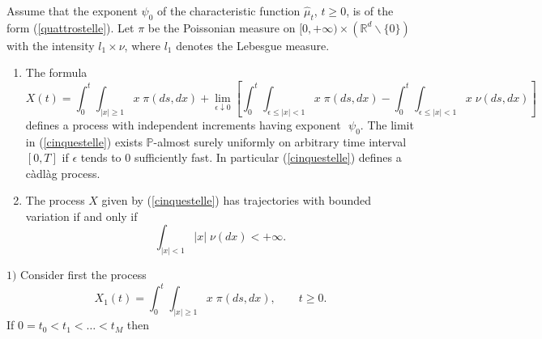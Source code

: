 \documentclass[preprint]{imsart}
\def\P{\mathbb P}
\def\R{\mathbb R}
\begin{document}
{\begin{Theorem}\label{rapprlevyprocess}
  Assume that the exponent $\psi_{0}$ of the characteristic function
  $\widehat{\mu}_t$, $t\geq 0$, is of the form
  (\ref{quattrostelle}). Let $\pi$ be the Poissonian measure on
  $[0,+\infty)\times (\R^d\backslash \{0\})$ with the intensity
  $l_1\times \nu$, where $l_1$ denotes the Lebesgue measure.
  \begin{enumerate}\item[i)]
The formula
\begin{equation}\label{cinquestelle}
  X(t)= \int_0^t \int_{|x|\geq 1}x\; \pi(ds,dx)+
  \lim_{\epsilon\downarrow 0}\left[
\int_0^t \int_{\epsilon\leq |x|< 1}x\; \pi(ds,dx)-
\int_0^t \int_{\epsilon\leq |x|< 1}x\; \nu(ds,dx)
  \right]
\end{equation}
defines a process with independent increments having exponent
$\,\,\psi_{0}$. The limit in (\ref{cinquestelle}) exists $\P$-almost
surely uniformly on arbitrary time interval $[0,T]$ if $\epsilon$
tends to $0$ sufficiently fast. In particular (\ref{cinquestelle})
defines a c\`adl\`ag process.
\item[ii)] The process $X$ given by (\ref{cinquestelle}) has
trajectories with bounded variation if and only if
$$
\int_{|x|< 1}|x|\;\nu(dx)<+\infty.
$$
\end{enumerate}
\end{Theorem}

$1)$ Consider first the process
$$
X_1(t)=  \int_0^t \int_{|x|\geq 1}x\; \pi(ds,dx),
\qquad t\ge 0.
$$
If $0=t_0<t_1<\ldots <t_M$ then

}
\end{document}
